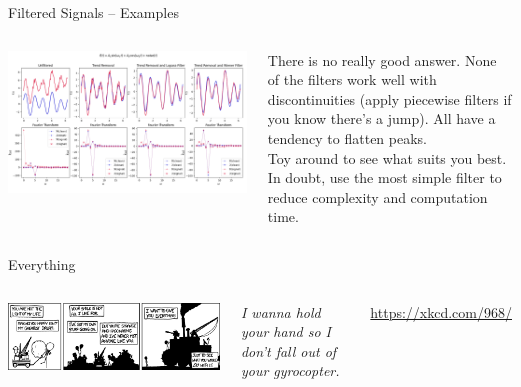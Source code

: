 \begin{frame}{Filtered Signals -- Examples}
%
\begin{columns}
\includegraphics[width=\linewidth]{./gfx/05-filters}
%
\begin{hintbox}
\footnotesize
There is no really good answer. None of the filters work well with discontinuities (apply piecewise filters if you know there's a jump). All have a tendency to flatten peaks.\\
Toy around to see what suits you best. In doubt, use the most simple filter to reduce complexity and computation time.
\end{hintbox}
\end{columns}
%
\end{frame}


\begin{frame}{Everything}
%
\begin{columns}
\begin{center}
\includegraphics[width=\linewidth]{./gfx/05-xkcd-everything}\\
\end{center}
%
\small
	\emph{I wanna hold your hand so I don't fall out of your gyrocopter.}

	\vspace{6pt}
	\url{https://xkcd.com/968/}
\end{columns}
%
\end{frame}

